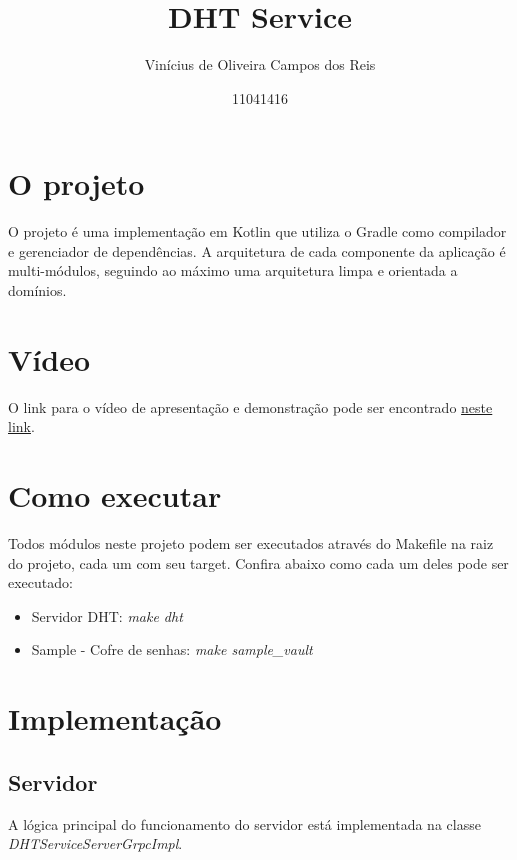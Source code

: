 \documentclass{article}
\title{DHT Service}
\author{Vinícius de Oliveira Campos dos Reis
\and 11041416}
\date{}
\begin{document}
    \maketitle

    \section{O projeto}\label{sec:introducao}

    O projeto é uma implementação em Kotlin que utiliza o Gradle como compilador e gerenciador de dependências.
    A arquitetura de cada componente da aplicação é multi-módulos, seguindo ao máximo uma arquitetura limpa e orientada a domínios.

    \section{Vídeo}\label{sec:video}

    O link para o vídeo de apresentação e demonstração pode ser encontrado \href{https://youtu.be/ouySVTWPqMg}{neste link}.

    \section{Como executar}\label{sec:como-executar}

    Todos módulos neste projeto podem ser executados através do Makefile na raiz do projeto, cada um com seu target.
    Confira abaixo como cada um deles pode ser executado:

    \begin{itemize}
        \item Servidor DHT: \textit{make dht}
        \item Sample - Cofre de senhas: \textit{make sample\_vault}
    \end{itemize}

    \section{Implementação}\label{sec:implementacao}

    \subsection{Servidor}\label{subsec:server}

    A lógica principal do funcionamento do servidor está implementada na classe \textit{DHTServiceServerGrpcImpl}.
\end{document}
